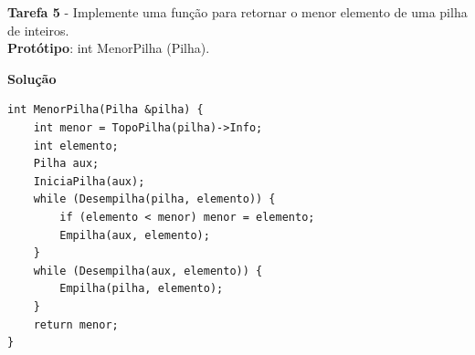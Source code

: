 \documentclass{article}
\begin{document}
\bigskip

\par
\noindent
\textbf{Tarefa 5} - Implemente uma função para retornar o menor elemento de uma pilha de inteiros.\\
\textbf{Protótipo}: int MenorPilha (Pilha).
\bigskip
\par
\noindent
\textbf{Solução}
\begin{lstlisting}
int MenorPilha(Pilha &pilha) {
	int menor = TopoPilha(pilha)->Info;
	int elemento;
	Pilha aux;
	IniciaPilha(aux);
	while (Desempilha(pilha, elemento)) {
		if (elemento < menor) menor = elemento;
		Empilha(aux, elemento);
	}
	while (Desempilha(aux, elemento)) {
		Empilha(pilha, elemento);
	}
	return menor;
}
\end{lstlisting}
\end{document}
